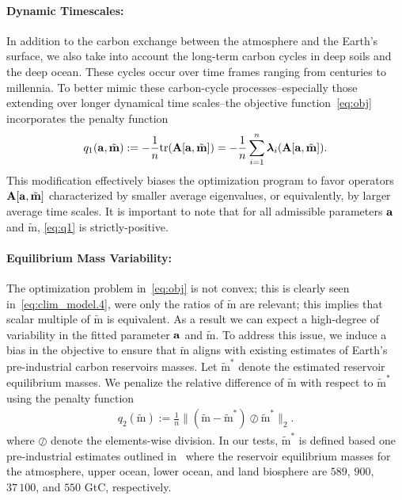 \documentclass[11pt, a4paper, pdftex, twoside, dvipsnames]{article}
\newcommand{\bb}[1]{\boldsymbol{\bold{#1}}}
\newcommand{\bbt}[1]{\tilde{\boldsymbol{\mathrm{#1}}}}
\newcommand{\tr}[1]{\text{tr}(#1)}
\newcommand{\ameq}[0]{\bb{a},\bbt{m}}
\begin{document}
\paragraph{Dynamic Timescales:}
In addition to the carbon exchange between the atmosphere and the Earth's surface, we also take into account the long-term carbon cycles in deep soils and the deep ocean. 
%
These cycles occur over time frames ranging from centuries to millennia. 
%
To better mimic these carbon-cycle processes--especially those extending over longer dynamical time scales--the objective function~\eqref{eq:obj} incorporates the penalty function 
%
\begin{align}\label{eq:q1}
	q_1(\ameq) := -\frac{1}{n} \tr{\bb{A}[\ameq]} = -\frac{1}{n}\sum_{i=1}^n \bb{\lambda}_i(\bb{A}[\ameq]).
\end{align}
This modification effectively biases the optimization program to favor operators $\bb{A}[\bb{a}, \bbt{m}]$ characterized by smaller average eigenvalues, or equivalently, by larger average time scales.
%
It is important to note that for all admissible parameters $\bb{a}$ and $\bbt{m}$, \eqref{eq:q1} is strictly-positive. 


\paragraph{Equilibrium Mass Variability:}
The optimization problem in~\eqref{eq:obj} is not convex; this is clearly seen in~\eqref{eq:clim_model.4}, were only the ratios of $\bbt{m}$ are relevant; this implies that scalar multiple of $\bbt{m}$ is equivalent.
%
As a result we can expect a high-degree of variability in the fitted parameter $\bb{a}$ and $\bbt{m}$.
%
To address this issue, we induce a bias in the objective to ensure that $\bbt{m}$ aligns with existing estimates of Earth's pre-industrial carbon reservoirs masses.
%
Let $\bbt{m}^*$ denote the estimated reservoir equilibrium masses.
%
We penalize the relative difference of $\bbt{m}$ with respect to $\bbt{m}^*$  using the penalty function  
%
\begin{align}\label{eq:q2}
	q_2(\bbt{m}) := \frac{1}{n} \Big\| (\bbt{m} - \bbt{m}^*) \oslash \bbt{m}^* \Big\|_2.
\end{align}
%
where $\oslash$ denote the elements-wise division. 
%
In our tests, $\bbt{m}^*$ is defined based one pre-industrial estimates outlined in~\cite{IPCC_carbon_cycle} where the reservoir equilibrium masses for the atmosphere, upper ocean, lower ocean, and land biosphere are $589$, $900$, $37\,100$, and $550$ GtC, respectively.
\end{document}

